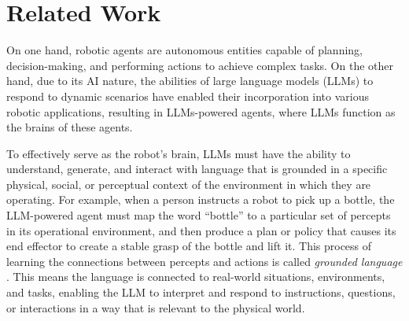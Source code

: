 \section{Related Work}
\label{sec:RelWork}
On one hand, robotic agents are autonomous entities capable of planning, decision-making, and performing actions to achieve complex tasks. On the other hand, due to its AI nature, the abilities of large language models (LLMs) to respond to dynamic scenarios have enabled their incorporation into various robotic applications, resulting in LLMs-powered agents, where LLMs function as the brains of these agents. 

To effectively serve as the robot's brain, LLMs must have the ability to understand, generate, and interact with language that is grounded in a specific physical, social, or perceptual context of the environment in which they are operating. For example, when a person instructs a
robot to pick up a bottle, the LLM-powered agent must map the word ``bottle” to a particular set of percepts in its operational environment, and then produce a plan or policy that causes its end effector to create a stable grasp of the bottle and lift it. This process of learning the connections between percepts and actions is called \textit{grounded language} \cite{tellex2020robots}. This means the language is connected to real-world situations, environments, and tasks, enabling the LLM to interpret and respond to instructions, questions, or interactions in a way that is relevant to the physical world.








